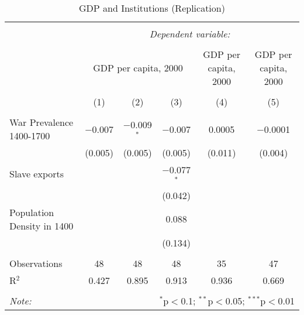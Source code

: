 
\begin{table}[!htbp] \centering 
  \caption{GDP and Institutions (Replication)} 
  \label{} 
\footnotesize 
\begin{tabular}{@{\extracolsep{2pt}}lccccc} 
\\[-1.8ex]\hline 
\hline \\[-1.8ex] 
 & \multicolumn{5}{c}{\textit{Dependent variable:}} \\ 
\cline{2-6} 
\\[-1.8ex] & \multicolumn{3}{c}{GDP per capita, 2000} & GDP per capita, 2000 & GDP per capita, 2000 \\ 
\\[-1.8ex] & (1) & (2) & (3) & (4) & (5)\\ 
\hline \\[-1.8ex] 
 War Prevalence 1400-1700 & $-$0.007 & $-$0.009$^{*}$ & $-$0.007 & 0.0005 & $-$0.0001 \\ 
  & (0.005) & (0.005) & (0.005) & (0.011) & (0.004) \\ 
  Slave exports &  &  & $-$0.077$^{*}$ &  &  \\ 
  &  &  & (0.042) &  &  \\ 
  Population Density in 1400 &  &  & 0.088 &  &  \\ 
  &  &  & (0.134) &  &  \\ 
 \hline \\[-1.8ex] 
Observations & 48 & 48 & 48 & 35 & 47 \\ 
R$^{2}$ & 0.427 & 0.895 & 0.913 & 0.936 & 0.669 \\ 
\hline 
\hline \\[-1.8ex] 
\textit{Note:}  & \multicolumn{5}{r}{$^{*}$p$<$0.1; $^{**}$p$<$0.05; $^{***}$p$<$0.01} \\ 
\end{tabular} 
\end{table} 
